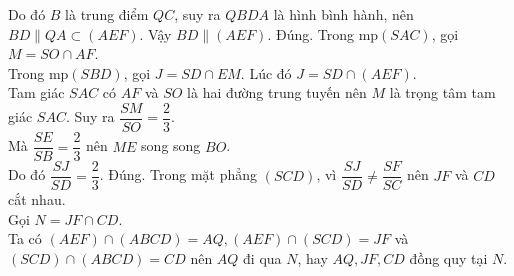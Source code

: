\begin{ex}
{\begin{itemchoice}
   Do đó $B$ là trung điểm $QC$, suy ra  $QBDA$ là hình bình hành, nên $BD\parallel QA\subset (AEF)$. Vậy $BD\parallel (AEF)$.
   \itemch Đúng. Trong  mp$(SAC)$, gọi $M=SO\cap AF$.\\
   Trong mp$(SBD)$, gọi $J=SD\cap  EM$. Lúc đó $J=SD\cap (AEF)$. \\
   Tam giác $SAC$ có $AF$ và $SO$ là hai đường trung tuyến nên  $M$ là trọng tâm tam giác $SAC$. Suy ra $\dfrac{SM}{SO}=\dfrac{2}{3}$.\\
   Mà $\dfrac{SE}{SB}=\dfrac{2}{3}$ nên $ME$ song song  $BO$.\\
   Do  đó $\dfrac{SJ}{SD}=\dfrac{2}{3}$.
   \itemch Đúng. Trong mặt phẳng $(SCD)$, vì $\dfrac{SJ}{SD}\neq \dfrac{SF}{SC}$  nên $JF$ và $CD$ cắt nhau.\\
   Gọi $N=JF\cap CD$.\\ 
   Ta có $(AEF)\cap (ABCD)=AQ, (AEF)\cap (SCD)=JF$  và $(SCD) \cap (ABCD)=CD$ nên $AQ$ đi qua $N$, hay $AQ, JF, CD$ đồng quy tại $N$.
  \end{itemchoice}
 } 
\end{ex}

